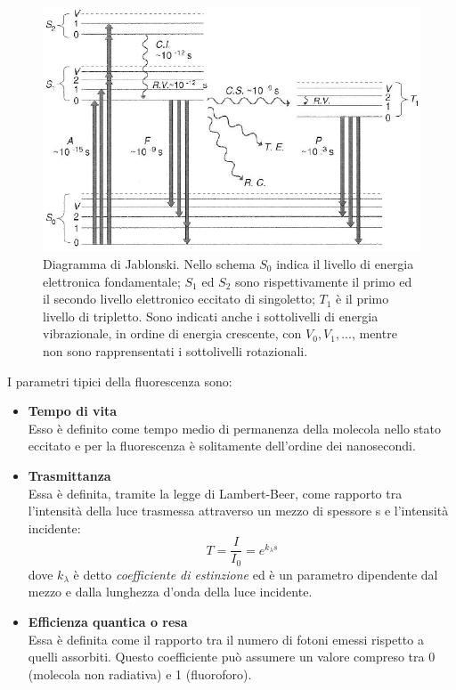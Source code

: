 \begin{figure}
 \centering
 \includegraphics[scale=.40]{img/CAP1jablonski.JPG}
 \caption{\small{Diagramma di Jablonski. Nello schema $S_0$ indica il livello di energia elettronica fondamentale; $S_1$ ed $S_2$ sono rispettivamente il primo ed il secondo livello elettronico eccitato di singoletto; $T_1$ è il primo livello di tripletto. Sono indicati anche i sottolivelli di energia vibrazionale, in ordine di energia crescente, con $V_0, V_1, ...$, mentre non sono rapprensentati i sottolivelli rotazionali.}}
 \label{fig:jablonski}
\end{figure}

I parametri tipici della fluorescenza sono:

\begin{itemize}
\item \textbf{Tempo di vita} \\
Esso è definito come tempo medio di permanenza della molecola nello stato eccitato e per la fluorescenza è solitamente dell'ordine dei nanosecondi.

\item \textbf{Trasmittanza} \\
Essa è definita, tramite la legge di Lambert-Beer, come rapporto tra l'intensità della luce trasmessa attraverso un mezzo di spessore s e l'intensità incidente: $$ T=\frac{I}{I_0} = e^ {k_\lambda s}$$ dove $k_\lambda$ è detto \textit{coefficiente di estinzione} ed è un parametro dipendente dal mezzo e dalla lunghezza d'onda della luce incidente.

\item \textbf{Efficienza quantica o resa} \\ 
Essa è definita come il rapporto tra il numero di fotoni emessi rispetto a quelli assorbiti. 
Questo coefficiente può assumere un valore compreso tra 0 (molecola non radiativa) e 1 (fluoroforo).
\end{itemize}


